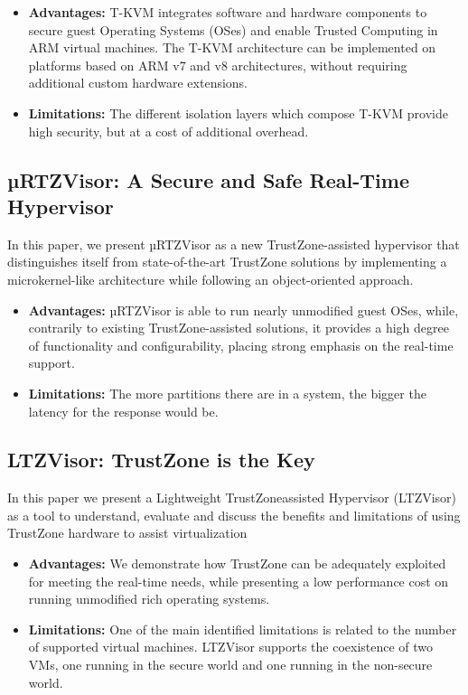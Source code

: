 \documentclass[conference]{IEEEtran}
\begin{document}
\begin{itemize}
    \item \textbf{Advantages:} T-KVM integrates software and hardware components to secure guest Operating Systems (OSes) and enable Trusted Computing in ARM virtual machines.  The T-KVM architecture can be implemented on platforms based on ARM v7 and v8 architectures, without requiring additional custom hardware extensions.
    \item \textbf{Limitations:} The different isolation layers which compose T-KVM provide high security, but at a cost of additional overhead.
\end{itemize}


\subsection{µRTZVisor: A Secure and Safe Real-Time Hypervisor}
In this paper, we present µRTZVisor as a new TrustZone-assisted hypervisor that distinguishes itself from state-of-the-art TrustZone solutions by implementing a microkernel-like architecture while following an object-oriented approach.
\begin{itemize}
    \item \textbf{Advantages:} µRTZVisor is able to run nearly unmodified guest OSes, while, contrarily to existing TrustZone-assisted solutions, it provides a high degree of functionality and configurability, placing strong emphasis on the real-time support.
    \item \textbf{Limitations:} The more partitions there are in a system, the bigger the latency for the response would be.
\end{itemize}


\subsection{LTZVisor: TrustZone is the Key}
In this paper we present a Lightweight TrustZoneassisted Hypervisor (LTZVisor) as a tool to understand, evaluate and discuss the benefits and limitations of using TrustZone hardware to assist virtualization
\begin{itemize}
    \item \textbf{Advantages:} We demonstrate how TrustZone can be adequately exploited for meeting the real-time needs, while presenting a low performance cost on running unmodified rich operating systems.
    \item \textbf{Limitations:} One of the main identified limitations is related to the number of supported virtual machines. LTZVisor supports the coexistence of two VMs, one running in the secure world and one running in the non-secure world.
\end{itemize}
\end{document}
